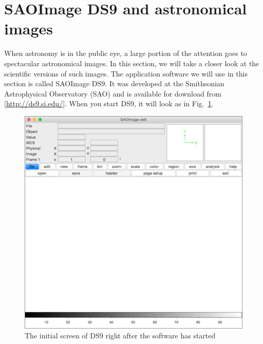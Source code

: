 \documentclass[twocolumn,apj]{openjournal}
\begin{document}
\section{SAOImage DS9 and astronomical images}
\label{DS9}
When astronomy is in the public eye, a large portion of the attention goes to spectacular astronomical images. In this section, we will take a closer look at the scientific versions of such images. The application software we will use in this section is called SAOImage DS9. It was developed at the Smithsonian Astrophysical Observatory (SAO)  and is available for download from [\href{http://ds9.si.edu/}{http://ds9.si.edu/}]. When you start DS9, it will look as in Fig.~\ref{SAOOpen}.
\begin{figure}[htbp]
\begin{center}
\includegraphics[width=\linewidth]{ds9.jpg}
\caption{The initial screen of DS9 right after the software has started}
\label{SAOOpen}
\end{center}
\end{figure}
\end{document}
